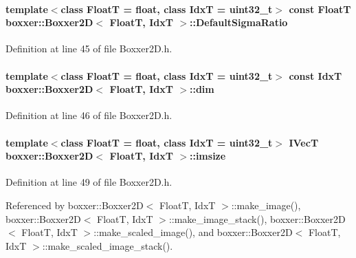 \paragraph[{\texorpdfstring{Default\+Sigma\+Ratio}{DefaultSigmaRatio}}]{\setlength{\rightskip}{0pt plus 5cm}template$<$class FloatT  = float, class IdxT  = uint32\+\_\+t$>$ const FloatT {\bf boxxer\+::\+Boxxer2D}$<$ FloatT, IdxT $>$\+::Default\+Sigma\+Ratio\hspace{0.3cm}{\ttfamily [static]}}\hypertarget{classboxxer_1_1Boxxer2D_a2175ae26a8a47e6bc57a6fb89cc9e177}{}\label{classboxxer_1_1Boxxer2D_a2175ae26a8a47e6bc57a6fb89cc9e177}


Definition at line 45 of file Boxxer2\+D.\+h.

\paragraph[{\texorpdfstring{dim}{dim}}]{\setlength{\rightskip}{0pt plus 5cm}template$<$class FloatT  = float, class IdxT  = uint32\+\_\+t$>$ const IdxT {\bf boxxer\+::\+Boxxer2D}$<$ FloatT, IdxT $>$\+::dim\hspace{0.3cm}{\ttfamily [static]}}\hypertarget{classboxxer_1_1Boxxer2D_a66f41631af87252601a33480c0433eea}{}\label{classboxxer_1_1Boxxer2D_a66f41631af87252601a33480c0433eea}


Definition at line 46 of file Boxxer2\+D.\+h.

\paragraph[{\texorpdfstring{imsize}{imsize}}]{\setlength{\rightskip}{0pt plus 5cm}template$<$class FloatT  = float, class IdxT  = uint32\+\_\+t$>$ {\bf I\+VecT} {\bf boxxer\+::\+Boxxer2D}$<$ FloatT, IdxT $>$\+::imsize}\hypertarget{classboxxer_1_1Boxxer2D_a6f76692e32f0c907d48a72a801a62b9a}{}\label{classboxxer_1_1Boxxer2D_a6f76692e32f0c907d48a72a801a62b9a}


Definition at line 49 of file Boxxer2\+D.\+h.



Referenced by boxxer\+::\+Boxxer2\+D$<$ Float\+T, Idx\+T $>$\+::make\+\_\+image(), boxxer\+::\+Boxxer2\+D$<$ Float\+T, Idx\+T $>$\+::make\+\_\+image\+\_\+stack(), boxxer\+::\+Boxxer2\+D$<$ Float\+T, Idx\+T $>$\+::make\+\_\+scaled\+\_\+image(), and boxxer\+::\+Boxxer2\+D$<$ Float\+T, Idx\+T $>$\+::make\+\_\+scaled\+\_\+image\+\_\+stack().

